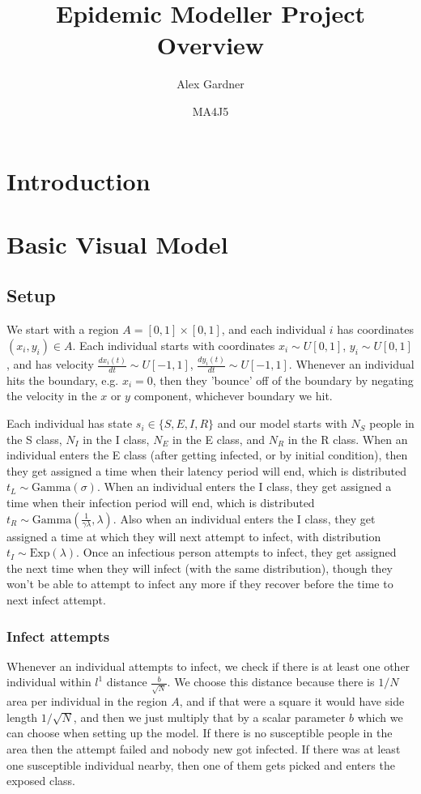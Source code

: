 \documentclass[11pt]{article}
\begin{document}
\title{Epidemic Modeller Project Overview}
\author{Alex Gardner}
\date{MA4J5}
\maketitle

\section*{Introduction}

\section*{Basic Visual Model}
\subsection*{Setup}
We start with a region $A=[0,1]\times [0,1]$, and each individual $i$ has coordinates $(x_i, y_i)\in A$. Each individual starts with coordinates $x_i \sim U[0,1]$, $y_i \sim U[0,1]$, and has velocity $\frac{dx_i(t)}{dt} \sim U[-1,1]$, $\frac{dy_i(t)}{dt} \sim U[-1,1]$. Whenever an individual hits the boundary, e.g. $x_i=0$, then they 'bounce' off of the boundary by negating the velocity in the $x$ or $y$ component, whichever boundary we hit.

Each individual has state $s_i\in \{S,E,I,R\}$ and our model starts with $N_S$ people in the S class, $N_I$ in the I class, $N_E$ in the E class, and $N_R$ in the R class. When an individual enters the E class (after getting infected, or by initial condition), then they get assigned a time when their latency period will end, which is distributed $t_L \sim \text{Gamma}(\sigma)$. When an individual enters the I class, they get assigned a time when their infection period will end, which is distributed $t_R \sim \text{Gamma}(\frac{1}{\gamma\lambda}, \lambda)$. Also when an individual enters the I class, they get assigned a time at which they will next attempt to infect, with distribution $t_I\sim \text{Exp}(\lambda)$. Once an infectious person attempts to infect, they get assigned the next time when they will infect (with the same distribution), though they won't be able to attempt to infect any more if they recover before the time to next infect attempt.
\subsubsection*{Infect attempts}
Whenever an individual attempts to infect, we check if there is at least one other individual within $l^1$ distance $\frac{b}{\sqrt{N}}$. We choose this distance because there is $1/N$ area per individual in the region $A$, and if that were a square it would have side length $1/\sqrt{N}$, and then we just multiply that by a scalar parameter $b$ which we can choose when setting up the model. If there is no susceptible people in the area then the attempt failed and nobody new got infected. If there was at least one susceptible individual nearby, then one of them gets picked and enters the exposed class.
\end{document}
